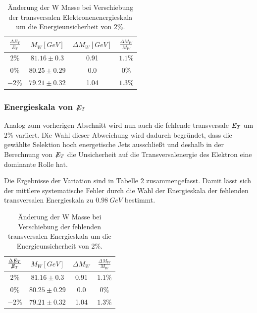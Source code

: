 \documentclass[a4paper,12pt]{article}
\newcommand{\met}{\ensuremath{\not\mathrel{E}}_T}
\begin{document}
\begin{table}[h]
	\centering
	\begin{tabular}{c| c c c}
		$\frac{\Delta E_{T}}{E_{T}}$ & $M_{W} [\si{GeV}]$ & $\Delta M_{W}[GeV]$ &$\frac{\Delta M_{W}}{M_{W}}$\\
		\hline
		$2\%$ & $81.16\pm 0.3$ & 0.91 & $1.1\%$\\
		$0\%$ & $80.25\pm 0.29$ & 0.0 & $0\%$ \\
		$-2\%$ & $79.21\pm 0.32$ & 1.04 &$1.3\%$
	\end{tabular}
	\caption{Änderung der W Masse bei Verschiebung der transversalen Elektronenenergieskala um die
	Energieunsicherheit von $2\%$.}
	\label{tab:syset}
\end{table}
\subsubsection*{Energieskala von $\met$}
Analog zum vorherigen Abschnitt wird nun auch die fehlende transversale $\met$ um $2\%$  variiert. Die Wahl dieser Abweichung wird dadurch begründet, dass
die gewählte Selektion hoch energetische Jets ausschließt und deshalb in der Berechnung von $\met$ die Unsicherheit
auf die Transversalenergie des Elektron eine dominante Rolle hat.



Die Ergebnisse der Variation sind in Tabelle \ref{tab:sysmet} zusammengefasst. Damit lässt sich der mittlere systematische Fehler durch die
Wahl der Energieskala der fehlenden transversalen Energieskala zu $\SI{0.98}{GeV}$ bestimmt.
\begin{table}[h]
	\centering
	\begin{tabular}{c| c c c}
		$\frac{\Delta \met}{\met}$ & $M_{W} [\si{GeV}]$ & $\Delta M_{W}$ &$\frac{\Delta M_{W}}{M_{W}}$\\
		\hline
		$2\%$ & $81.16\pm 0.3$ & 0.91 & $1.1\%$\\
		$0\%$ & $80.25\pm 0.29$ & 0.0 & $0\%$ \\
		$-2\%$ & $79.21\pm 0.32$ & 1.04 &$1.3\%$
	\end{tabular}
	\caption{Änderung der W Masse bei Verschiebung der fehlenden transversalen Energieskala um die
	Energieunsicherheit von $2\%$.}
	\label{tab:sysmet}
\end{table}
\end{document}
